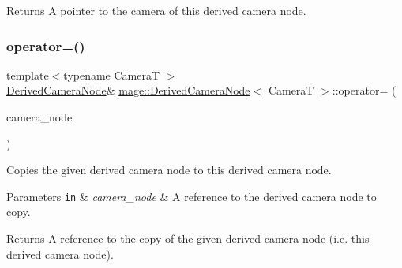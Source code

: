 \begin{DoxyReturn}{Returns}
A pointer to the camera of this derived camera node. 
\end{DoxyReturn}
\hypertarget{classmage_1_1_derived_camera_node_a827c7952e061c6e12e38fff12585b3b3}{}\label{classmage_1_1_derived_camera_node_a827c7952e061c6e12e38fff12585b3b3} 
\subsubsection{\texorpdfstring{operator=()}{operator=()}\hspace{0.1cm}{\footnotesize\ttfamily [1/2]}}
{\footnotesize\ttfamily template$<$typename CameraT $>$ \\
\hyperlink{classmage_1_1_derived_camera_node}{Derived\+Camera\+Node}\& \hyperlink{classmage_1_1_derived_camera_node}{mage\+::\+Derived\+Camera\+Node}$<$ CameraT $>$\+::operator= (\begin{DoxyParamCaption}\item[{const \hyperlink{classmage_1_1_derived_camera_node}{Derived\+Camera\+Node}$<$ CameraT $>$ \&}]{camera\+\_\+node }\end{DoxyParamCaption})\hspace{0.3cm}{\ttfamily [delete]}}

Copies the given derived camera node to this derived camera node.


\begin{DoxyParams}[1]{Parameters}
\mbox{\tt in}  & {\em camera\+\_\+node} & A reference to the derived camera node to copy. \\
\hline
\end{DoxyParams}
\begin{DoxyReturn}{Returns}
A reference to the copy of the given derived camera node (i.\+e. this derived camera node). 
\end{DoxyReturn}
\hypertarget{classmage_1_1_derived_camera_node_a5faeff6f71a85b46d18f5b55e8dcf756}{}\label{classmage_1_1_derived_camera_node_a5faeff6f71a85b46d18f5b55e8dcf756} 
